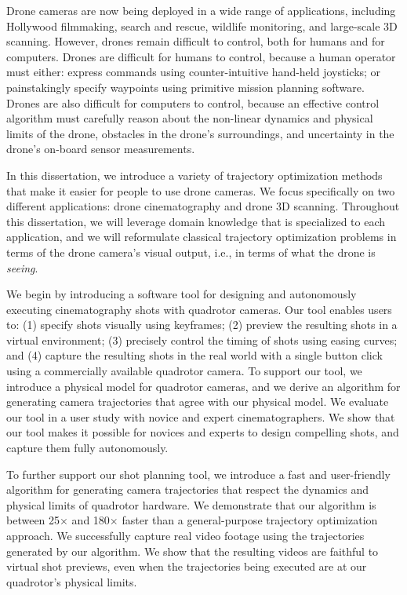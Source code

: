 
Drone cameras are now being deployed in a wide range of applications, including Hollywood filmmaking, search and rescue, wildlife monitoring, and large-scale 3D scanning.
However, drones remain difficult to control, both for humans and for computers.
Drones are difficult for humans to control, because a human operator must either: express commands using counter-intuitive hand-held joysticks; or painstakingly specify waypoints using primitive mission planning software.
Drones are also difficult for computers to control, because an effective control algorithm must carefully reason about the non-linear dynamics and physical limits of the drone, obstacles in the drone's surroundings, and uncertainty in the drone's on-board sensor measurements.

In this dissertation, we introduce a variety of trajectory optimization methods that make it easier for people to use drone cameras.
We focus specifically on two different applications: drone cinematography and drone 3D scanning.
Throughout this dissertation, we will leverage domain knowledge that is specialized to each application, and we will reformulate classical trajectory optimization problems in terms of the drone camera's visual output, i.e., in terms of what the drone is \emph{seeing}.

We begin by introducing a software tool for designing and autonomously executing cinematography shots with quadrotor cameras.
Our tool enables users to: (1) specify shots visually using keyframes; (2) preview the resulting shots in a virtual environment; (3) precisely control the timing of shots using easing curves; and (4) capture the resulting shots in the real world with a single button click using a commercially available quadrotor camera.
To support our tool, we introduce a physical model for quadrotor cameras, and we derive an algorithm for generating camera trajectories that agree with our physical model.
We evaluate our tool in a user study with novice and expert cinematographers.
We show that our tool makes it possible for novices and experts to design compelling shots, and capture them fully autonomously.

To further support our shot planning tool, we introduce a fast and user-friendly algorithm for generating camera trajectories that respect the dynamics and physical limits of quadrotor hardware.
We demonstrate that our algorithm is between 25$\times$ and 180$\times$ faster than a general-purpose trajectory optimization approach.
We successfully capture real video footage using the trajectories generated by our algorithm.
We show that the resulting videos are faithful to virtual shot previews, even when the trajectories being executed are at our quadrotor's physical limits.

